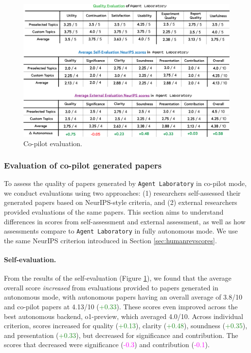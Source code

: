 \documentclass[11pt, a4paper]{gdm_format}
\begin{document}
\begin{figure}
    \centering
    \includegraphics[width=0.99\linewidth]{images/pngs/copilot_evals.png}
    \caption{Co-pilot evaluation.}
    \label{fig:copilot_fig}
\end{figure}


\subsubsection{Evaluation of co-pilot generated papers}

To assess the quality of papers generated by \texttt{Agent Laboratory} in co-pilot mode, we conduct evaluations using two approaches: (1) researchers self-assessed their generated papers based on NeurIPS-style criteria, and (2) external researchers provided evaluations of the same papers. This section aims to understand differences in scores from self-assessment and external assessment, as well as how assessments compare to \texttt{Agent Laboratory} in fully autonomous mode. We use the same NeurIPS criterion introduced in Section \ref{sec:humanrevscores}.

\paragraph{Self-evaluation.} From the results of the self-evaluation (Figure \ref{fig:copilot_fig}), we found that the average overall score \textit{increased} from evaluations provided to papers generated in autonomous mode, with autonomous papers having an overall average of 3.8/10 and co-pilot papers at 4.13/10 (\textcolor{ForestGreen}{+0.33}). These scores even improved across the best autonomous backend, o1-preview, which averaged 4.0/10. Across individual criterion, scores increased for quality (\textcolor{ForestGreen}{+0.13}), clarity (\textcolor{ForestGreen}{+0.48}), soundness (\textcolor{ForestGreen}{+0.35}), and presentation (\textcolor{ForestGreen}{+0.33}), but decreased for significance and contribution. The scores that decreased were significance (\textcolor{Magenta}{-0.3}) and contribution (\textcolor{Magenta}{-0.1}). 
\end{document}
